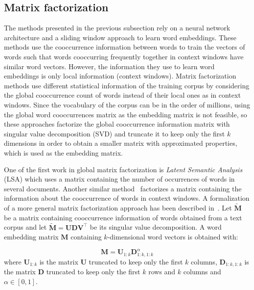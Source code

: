   \subsection{Matrix factorization}
    \label{ch03:subsec:matrix-factorization}
    The methods presented in the previous subsection rely on a neural network
    architecture and a sliding window approach to learn word embeddings. These
    methods use the cooccurrence information between words to train the vectors
    of words such that words cooccurring frequently together in context windows
    have similar word vectors. However, the information they use to learn word
    embeddings is only local information (context windows). Matrix factorization
    methods use different statistical information of the training corpus by
    considering the global cooccurrence count of words instead of their local
    ones as in context windows. Since the vocabulary of the corpus can be in the
    order of millions, using the global word cooccurrences matrix as the
    embedding matrix is not feasible, so these approaches factorize the global
    cooccurrence information matrix with singular value decomposition (SVD) and
    truncate it to keep only the first $k$ dimensions in order to obtain a
    smaller matrix with approximated properties, which is used as the embedding
    matrix. \medskip

    One of the first work in global matrix factorization is \textit{Latent
    Semantic Analysis} (LSA) \citep{deerwester1990lsa} which uses a matrix
    containing the number of occurrences of words in several documents. Another
    similar method~\citep{lund1996hal} factorizes a matrix containing the
    information about the cooccurrence of words in context windows. A
    formalization of a more general matrix factorization approach has been
    described in~\citep{turney2012domain, levy2014factorization}. Let
    $\widetilde{\mathbf{M}}$ be a matrix containing cooccurrence information of
    words obtained from a text corpus and let $\widetilde{\mathbf{M}} =
    \mathbf{U} \mathbf{D} \mathbf{V}^\top$ be its singular value decomposition.
    A word embedding matrix $\mathbf{M}$ containing $k$-dimensional word vectors
    is obtained with:

    \begin{equation}
      \mathbf{M} = \mathbf{U}_{1:k} \mathbf{D}_{1:k, 1:k}^\alpha
    \end{equation}
    where $\mathbf{U}_{1:k}$ is the matrix $\mathbf{U}$ truncated to keep only
    the first $k$ columns, $\mathbf{D}_{1:k,1:k}$ is the matrix $\mathbf{D}$
    truncated to keep only the first $k$ rows and $k$ columns and $\alpha \in
    [0,1]$. \medskip

